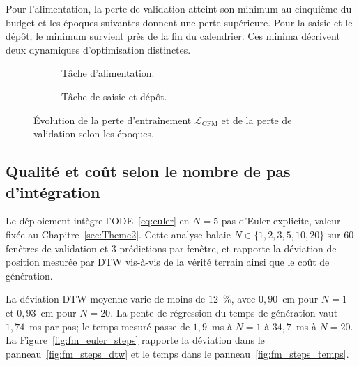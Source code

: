 Pour l'alimentation, la perte de validation atteint son minimum au cinquième du budget et les époques suivantes donnent une perte supérieure. Pour la saisie et le dépôt, le minimum survient près de la fin du calendrier. Ces minima décrivent deux dynamiques d'optimisation distinctes.

\begin{figure}[!htbp]
    \centering
    \begin{subfigure}[b]{0.48\textwidth}
        \centering
        
        \caption{Tâche d'alimentation.}\label{fig:fm_loss_feed}
    \end{subfigure}
    \hfill
    \begin{subfigure}[b]{0.48\textwidth}
        \centering
        
        \caption{Tâche de saisie et dépôt.}\label{fig:fm_loss_pp}
    \end{subfigure}
    \caption[Évolution de la perte CFM lors de l'entraînement]{Évolution de la perte d'entraînement $\mathcal{L}_{\mathrm{CFM}}$ et de la perte de validation selon les époques.}\label{fig:fm_loss_curves}
\end{figure}

\subsection*{Qualité et coût selon le nombre de pas d'intégration}

Le déploiement intègre l'\ac{ODE}~\eqref{eq:euler} en $N=5$ pas d'Euler explicite, valeur fixée au Chapitre~\ref{sec:Theme2}. Cette analyse balaie $N \in \{1, 2, 3, 5, 10, 20\}$ sur $60$ fenêtres de validation et $3$ prédictions par fenêtre, et rapporte la déviation de position mesurée par \ac{DTW} vis-à-vis de la vérité terrain ainsi que le coût de génération.

La déviation \ac{DTW} moyenne varie de moins de $12$~\%, avec $0{,}90$~cm pour $N=1$ et $0{,}93$~cm pour $N=20$. La pente de régression du temps de génération vaut $1{,}74$~ms par pas; le temps mesuré passe de $1{,}9$~ms à $N=1$ à $34{,}7$~ms à $N=20$. La Figure~\ref{fig:fm_euler_steps} rapporte la déviation dans le panneau~\ref{fig:fm_steps_dtw} et le temps dans le panneau~\ref{fig:fm_steps_temps}.

